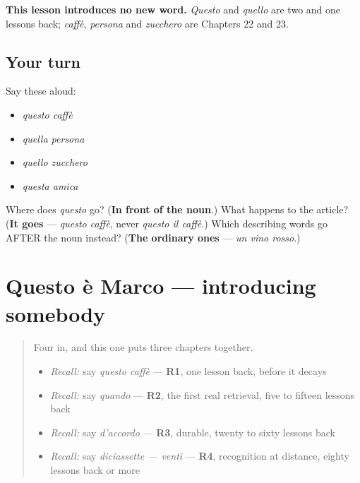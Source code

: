 \textbf{This lesson introduces no new word.} \emph{Questo} and \emph{quello} are two and one lessons back; \emph{caffè}, \emph{persona} and \emph{zucchero} are Chapters 22 and 23.

\subsection*{Your turn}
Say these aloud:

\begin{itemize}
\raggedright
  \item \emph{questo caffè}
  \item \emph{quella persona}
  \item \emph{quello zucchero}
  \item \emph{questa amica}
\end{itemize}

\begin{tcolorbox}[breakable,colback=teal!4,colframe=teal!35!black,title={Before you move on}]
Where does \emph{questo} go? (\textbf{In front of the noun}.) What happens to the article? (\textbf{It goes} — \emph{questo caffè}, never \emph{questo il caffè}.) Which describing words go AFTER the noun instead? (\textbf{The ordinary ones} — \emph{un vino rosso}.)
\end{tcolorbox}
\section[Questo è Marco]{Questo è Marco — introducing somebody}

\label{lesson:IT-C33-questo-e}



\begin{quote}
Four in, and this one puts three chapters together.

\begin{itemize}
\raggedright
  \item \emph{Recall:} say \emph{questo caffè} — \textbf{R1}, one lesson back, before it decays
  \item \emph{Recall:} say \emph{quando} — \textbf{R2}, the first real retrieval, five to fifteen lessons back
  \item \emph{Recall:} say \emph{d'accordo} — \textbf{R3}, durable, twenty to sixty lessons back
  \item \emph{Recall:} say \emph{diciassette — venti} — \textbf{R4}, recognition at distance, eighty lessons back or more
\end{itemize}
\end{quote}

